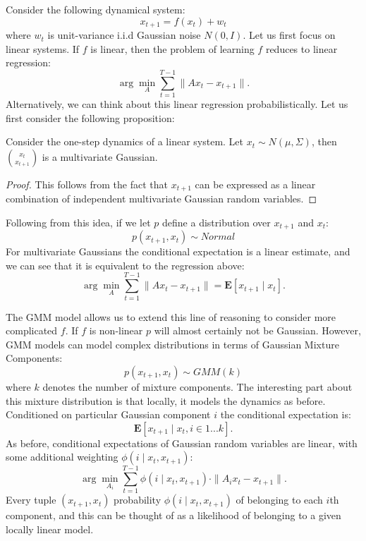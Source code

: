 Consider the following dynamical system:
\[
x_{t+1} = f(x_{t}) + w_{t}
\]
where $w_{t}$ is unit-variance i.i.d Gaussian noise $N(0,I)$.
Let us first focus on linear systems.
If $f$ is linear, then the problem of learning $f$ reduces to linear regression:
\[
\arg\min_{A} \sum_{t=1}^{T-1} \|Ax_{t} - x_{t+1}\|.
\]
Alternatively, we can think about this linear regression probabilistically.
Let us first consider the following proposition:

\vspace{0.75em}

\begin{proposition}
Consider the one-step dynamics of a linear system.
Let $x_{t} \sim N(\mu, \Sigma)$, then $\binom{x_{t}}{x_{t+1}}$ is a multivariate Gaussian.
\end{proposition}
\begin{proof}
This follows from the fact that $x_{t+1}$ can be expressed as a linear combination of independent multivariate Gaussian random variables.
\end{proof}

\vspace{0.5em}

Following from this idea, if we let $p$ define a distribution over $x_{t+1}$ and $x_{t}$:
\[
p(x_{t+1},x_{t}) \sim Normal
\]
For multivariate Gaussians the conditional expectation is a linear estimate, and we can see that it is equivalent to the regression above:
\[
\arg\min_{A} \sum_{t=1}^{T-1} \|Ax_{t} - x_{t+1}\| = \mathbf{E}[x_{t+1} \mid x_{t}].
\]

The GMM model allows us to extend this line of reasoning to consider more complicated $f$.
If $f$ is non-linear $p$ will almost certainly not be Gaussian.
However, GMM models can model complex distributions in terms of Gaussian Mixture Components:
\[
p(x_{t+1},x_{t}) \sim GMM(k)
\]
where $k$ denotes the number of mixture components.
The interesting part about this mixture distribution is that locally, it models the dynamics as before.
Conditioned on particular Gaussian component $i$ the conditional expectation is:
\[
\mathbf{E}[x_{t+1} \mid x_{t}, i \in 1...k].
\]
As before, conditional expectations of Gaussian random variables are linear, with some additional weighting $\phi(i \mid x_{t},x_{t+1})$:
\[
\arg\min_{A_i} \sum_{t=1}^{T-1} \phi(i \mid x_{t},x_{t+1}) \cdot \|A_ix_{t} - x_{t+1}\|.
\]
Every tuple $(x_{t+1},x_{t})$ probability $\phi(i \mid x_{t},x_{t+1})$ of belonging to each $i$th component, and this can be thought of as a likelihood of belonging to a given locally linear model.

